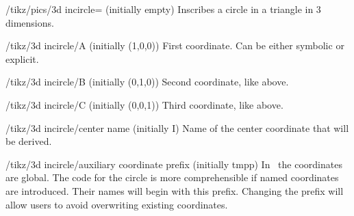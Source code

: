 \documentclass[a4paper,fleqn]{ltxdoc}
\begin{document}
\begin{codeexample}[width=4.5cm,preamble={\usetikzlibrary{3dtools}}]
\end{codeexample}


\begin{key}{/tikz/pics/3d incircle= (initially empty)}
        Inscribes a circle in a triangle in 3 dimensions.
\end{key}
\begin{key}{/tikz/3d incircle/A (initially {(1,0,0)})}
        First coordinate. Can be either symbolic or explicit. 
\end{key}
\begin{key}{/tikz/3d incircle/B (initially {(0,1,0)})}
        Second coordinate, like above.
\end{key}
\begin{key}{/tikz/3d incircle/C (initially {(0,0,1)})}
        Third coordinate, like above.
\end{key}
\begin{key}{/tikz/3d incircle/center name (initially {I})}
        Name of the center coordinate that will be derived.
\end{key}
\begin{key}{/tikz/3d incircle/auxiliary coordinate prefix (initially {tmpp})}
		In \tikzname\ the coordinates are global. The code for the circle is
		more comprehensible if named coordinates are introduced. Their names
		will begin with this prefix. Changing the prefix will allow users to
		avoid overwriting existing coordinates.
\end{key}

\begin{codeexample}[width=2.5cm,preamble={\usetikzlibrary{3dtools}}]
\end{codeexample}
\end{document}
